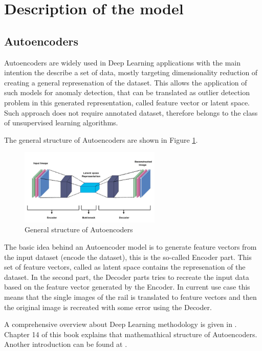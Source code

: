 \section{Description of the model} \label{model}
\subsection{Autoencoders}
Autoencoders are widely used in Deep Learning applications with the main intention
the describe a set of data, mostly targeting dimensionality reduction of creating
a general represenation of the dataset.
This allows the application of such models for anomaly detection, that can be translated
as outlier detection problem in this generated representation,
called feature vector or latent space.
Such approach does not require annotated dataset, therefore belongs to the class of
unsupervised learning algorithms.

The general structure of Autoencoders are shown in Figure \ref{fig:autoencoder}.

\begin{figure}[!ht]
    \centering
    \includegraphics[width=0.6\textwidth]{./tex_images/autoencoder.jpeg}
    \caption{General structure of Autoencoders \cite{khosla_auto_2021}}
    \label{fig:autoencoder}
\end{figure}

The basic idea behind an Autoencoder model is to generate feature vectors from the input
dataset (encode the dataset), this is the so-called Encoder part.
This set of feature vectors, called as latent space contains the represenation of the dataset.
In the second part, the Decoder parts tries to recreate the input data based on the feature vector
generated by the Encoder.
In current use case this means that the single images of the rail is translated to feature vectors
and then the original image is recreated with some error using the Decoder.

A comprehensive overview about Deep Learning methodology is given in \cite{Goodfellow-et-al-2016}.
Chapter 14 of this book explains that mathemathical structure of Autoencoders.
Another introduction can be found at \cite{_autoencoder_2023}.

